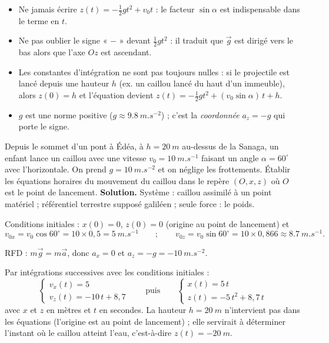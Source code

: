 \documentclass[11pt]{article}
\begin{document}
\begin{attention}
\begin{itemize}
\item Ne jamais écrire $z(t) = -\frac{1}{2}gt^2 + v_0 t$ : le facteur $\sin\alpha$ est indispensable dans le terme en $t$.
\item Ne pas oublier le signe « $-$ » devant $\frac{1}{2}gt^2$ : il traduit que $\vec{g}$ est dirigé vers le bas alors que l'axe $Oz$ est ascendant.
\item Les constantes d'intégration ne sont pas toujours nulles : si le projectile est lancé depuis une hauteur $h$ (ex. un caillou lancé du haut d'un immeuble), alors $z(0) = h$ et l'équation devient $z(t) = -\frac{1}{2}gt^2 + (v_0\sin\alpha)\,t + h$.
\item $g$ est une norme positive ($g \approx \SI{9,8}{m.s^{-2}}$) ; c'est la \emph{coordonnée} $a_z = -g$ qui porte le signe.
\end{itemize}
\end{attention}

\begin{exoresolu}
Depuis le sommet d'un pont à Édéa, à $h = \SI{20}{m}$ au-dessus de la Sanaga, un enfant lance un caillou avec une vitesse $v_0 = \SI{10}{m.s^{-1}}$ faisant un angle $\alpha = 60^{\circ}$ avec l'horizontale. On prend $g = \SI{10}{m.s^{-2}}$ et on néglige les frottements. Établir les équations horaires du mouvement du caillou dans le repère $(O, x, z)$ où $O$ est le point de lancement.
\tcblower
\textbf{Solution.} Système : caillou assimilé à un point matériel ; référentiel terrestre supposé galiléen ; seule force : le poids.

Conditions initiales : $x(0) = 0$, $z(0) = 0$ (origine au point de lancement) et
\[ v_{0x} = v_0\cos 60^{\circ} = 10\times 0{,}5 = \SI{5}{m.s^{-1}} \qquad ; \qquad v_{0z} = v_0\sin 60^{\circ} = 10\times 0{,}866 \approx \SI{8,7}{m.s^{-1}}. \]

RFD : $m\vec{g} = m\vec{a}$, donc $a_x = 0$ et $a_z = -g = -\SI{10}{m.s^{-2}}$.

Par intégrations successives avec les conditions initiales :
\[ \begin{cases} v_x(t) = 5 \\ v_z(t) = -10\,t + 8{,}7 \end{cases} \qquad \text{puis} \qquad \begin{cases} x(t) = 5\,t \\ z(t) = -5\,t^2 + 8{,}7\,t \end{cases} \]
avec $x$ et $z$ en mètres et $t$ en secondes. La hauteur $h = \SI{20}{m}$ n'intervient pas dans les équations (l'origine est au point de lancement) ; elle servirait à déterminer l'instant où le caillou atteint l'eau, c'est-à-dire $z(t) = -\SI{20}{m}$.
\end{exoresolu}
\end{document}

